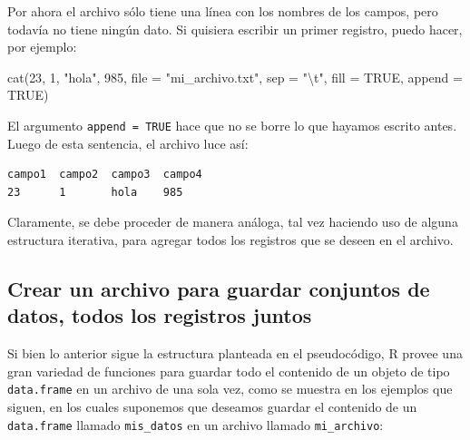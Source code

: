 \documentclass[
]{book}
\newenvironment{Shaded}{\begin{snugshade}}{\end{snugshade}}
\newcommand{\AttributeTok}[1]{\textcolor[rgb]{0.77,0.63,0.00}{#1}}
\newcommand{\ConstantTok}[1]{\textcolor[rgb]{0.00,0.00,0.00}{#1}}
\newcommand{\DecValTok}[1]{\textcolor[rgb]{0.00,0.00,0.81}{#1}}
\newcommand{\FunctionTok}[1]{\textcolor[rgb]{0.00,0.00,0.00}{#1}}
\newcommand{\NormalTok}[1]{#1}
\newcommand{\SpecialCharTok}[1]{\textcolor[rgb]{0.00,0.00,0.00}{#1}}
\newcommand{\StringTok}[1]{\textcolor[rgb]{0.31,0.60,0.02}{#1}}
\begin{document}
Por ahora el archivo sólo tiene una línea con los nombres de los campos, pero todavía no tiene ningún dato. Si quisiera escribir un primer registro, puedo hacer, por ejemplo:

\begin{Shaded}
\begin{Highlighting}[]
\FunctionTok{cat}\NormalTok{(}\DecValTok{23}\NormalTok{, }\DecValTok{1}\NormalTok{, }\StringTok{"hola"}\NormalTok{, }\DecValTok{985}\NormalTok{, }\AttributeTok{file =} \StringTok{"mi\_archivo.txt"}\NormalTok{, }\AttributeTok{sep =} \StringTok{"}\SpecialCharTok{\textbackslash{}t}\StringTok{"}\NormalTok{, }\AttributeTok{fill =} \ConstantTok{TRUE}\NormalTok{, }\AttributeTok{append =} \ConstantTok{TRUE}\NormalTok{)}
\end{Highlighting}
\end{Shaded}

El argumento \texttt{append\ =\ TRUE} hace que no se borre lo que hayamos escrito antes. Luego de esta sentencia, el archivo luce así:

\begin{verbatim}
campo1  campo2  campo3  campo4
23      1       hola    985 
\end{verbatim}

Claramente, se debe proceder de manera análoga, tal vez haciendo uso de alguna estructura iterativa, para agregar todos los registros que se deseen en el archivo.

\hypertarget{crear-un-archivo-para-guardar-conjuntos-de-datos-todos-los-registros-juntos}{%
\subsection{Crear un archivo para guardar conjuntos de datos, todos los registros juntos}\label{crear-un-archivo-para-guardar-conjuntos-de-datos-todos-los-registros-juntos}}

Si bien lo anterior sigue la estructura planteada en el pseudocódigo, R provee una gran variedad de funciones para guardar todo el contenido de un objeto de tipo \texttt{data.frame} en un archivo de una sola vez, como se muestra en los ejemplos que siguen, en los cuales suponemos que deseamos guardar el contenido de un \texttt{data.frame} llamado \texttt{mis\_datos} en un archivo llamado \texttt{mi\_archivo}:
\end{document}
